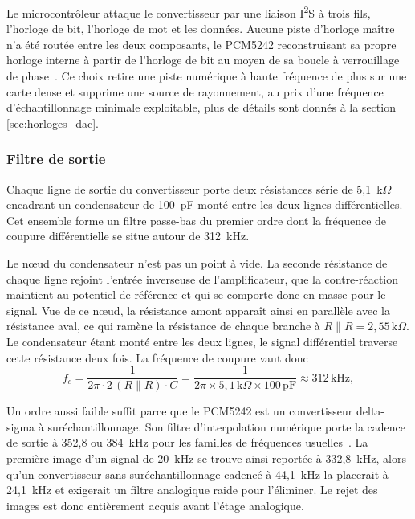 Le microcontrôleur attaque le convertisseur par une liaison I\textsuperscript{2}S à trois fils, l'horloge de bit, l'horloge de mot et les données. Aucune piste d'horloge maître n'a été routée entre les deux composants, le PCM5242 reconstruisant sa propre horloge interne à partir de l'horloge de bit au moyen de sa boucle à verrouillage de phase~\cite{TI_PCM5242}. Ce choix retire une piste numérique à haute fréquence de plus sur une carte dense et supprime une source de rayonnement, au prix d'une fréquence d'échantillonnage minimale exploitable, plus de détails sont donnés à la section \ref{sec:horloges_dac}.

\subsubsection{Filtre de sortie}

Chaque ligne de sortie du convertisseur porte deux résistances série de 5,1~k$\Omega$ encadrant un condensateur de 100~pF monté entre les deux lignes différentielles. Cet ensemble forme un filtre passe-bas du premier ordre dont la fréquence de coupure différentielle se situe autour de 312~kHz.

Le nœud du condensateur n'est pas un point à vide. La seconde résistance de chaque ligne rejoint l'entrée inverseuse de l'amplificateur, que la contre-réaction maintient au potentiel de référence et qui se comporte donc en masse pour le signal. Vue de ce nœud, la résistance amont apparaît ainsi en parallèle avec la résistance aval, ce qui ramène la résistance de chaque branche à $R \parallel R = 2{,}55\,\text{k}\Omega$. Le condensateur étant monté entre les deux lignes, le signal différentiel traverse cette résistance deux fois. La fréquence de coupure vaut donc
\begin{equation}
  f_c = \frac{1}{2\pi \cdot 2\,(R \parallel R) \cdot C} = \frac{1}{2\pi \times 5{,}1\,\text{k}\Omega \times 100\,\text{pF}} \approx 312\,\text{kHz},
\end{equation}

Un ordre aussi faible suffit parce que le PCM5242 est un convertisseur delta-sigma à suréchantillonnage. Son filtre d'interpolation numérique porte la cadence de sortie à 352,8 ou 384~kHz pour les familles de fréquences usuelles~\cite{TI_PCM5242}. La première image d'un signal de 20~kHz se trouve ainsi reportée à 332,8~kHz, alors qu'un convertisseur sans suréchantillonnage cadencé à 44,1~kHz la placerait à 24,1~kHz et exigerait un filtre analogique raide pour l'éliminer. Le rejet des images est donc entièrement acquis avant l'étage analogique.

